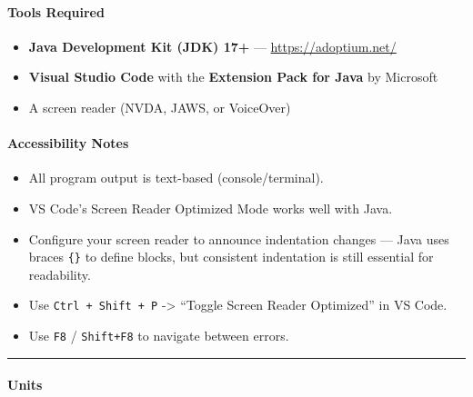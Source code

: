 \documentclass[
  justified,
  openright,
]{tufte-book}
\let\subsection\paragraph
\let\paragraph\paragraph
\let\subsection\paragraph
\let\paragraph\paragraph
\providecommand{\tightlist}{%
  \setlength{\itemsep}{0pt}\setlength{\parskip}{0pt}}
\begin{document}
\subsection{Tools Required}\label{tools-required-1}

\begin{itemize}
\tightlist
\item
  \textbf{Java Development Kit (JDK) 17+} ---
  \url{https://adoptium.net/}
\item
  \textbf{Visual Studio Code} with the \textbf{Extension Pack for Java}
  by Microsoft
\item
  A screen reader (NVDA, JAWS, or VoiceOver)
\end{itemize}

\subsection{Accessibility Notes}\label{accessibility-notes-1}

\begin{itemize}
\tightlist
\item
  All program output is text-based (console/terminal).
\item
  VS Code's Screen Reader Optimized Mode works well with Java.
\item
  Configure your screen reader to announce indentation changes --- Java
  uses braces \texttt{\{\}} to define blocks, but consistent indentation
  is still essential for readability.
\item
  Use \texttt{Ctrl\ +\ Shift\ +\ P} -\textgreater{} ``Toggle Screen
  Reader Optimized'' in VS Code.
\item
  Use \texttt{F8} / \texttt{Shift+F8} to navigate between errors.
\end{itemize}

\begin{center}\rule{0.5\linewidth}{0.5pt}\end{center}

\subsection{Units}\label{units-1}
\end{document}
